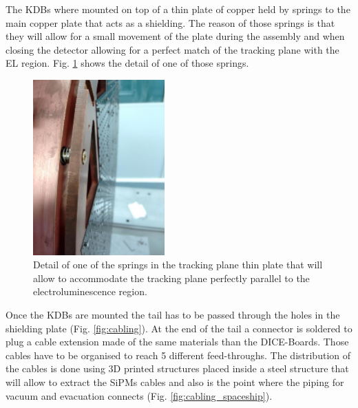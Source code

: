The KDBs  where mounted on top of a thin plate of copper held by springs to the main copper plate that acts as a shielding. The reason of those springs is that they will allow for a small movement of the plate during the assembly and when closing the detector allowing for a perfect match of the tracking plane with the EL region. Fig. \ref{fig:spring_detail} shows the detail of one of those springs.

\begin{figure}[h!]
\begin{center}
\includegraphics[width=0.45\textwidth]{TrackingPlane/IMG/spring_plate_detail}
\caption{Detail of one of the springs in the tracking plane thin plate that will allow to accommodate the tracking plane perfectly parallel to the electroluminescence region.}
\label{fig:spring_detail}
\end{center}
\end{figure}

Once the KDBs are mounted the tail has to be passed through the holes in the shielding plate (Fig. \ref{fig:cabling}). At the end of the tail a connector is soldered to plug a cable extension made of the same materials than the DICE-Boards. Those cables have to be organised to reach 5 different feed-throughs. The distribution of the cables is done using 3D printed structures placed inside a steel structure that will allow to extract the SiPMs cables and also is the point where the piping for vacuum and evacuation connects (Fig. \ref{fig:cabling_spaceship}).


